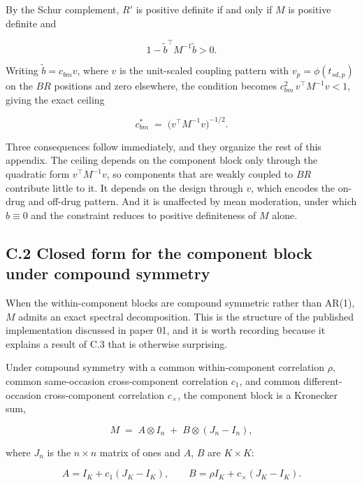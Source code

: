 \documentclass[
  11pt,
]{article}
\begin{document}
By the Schur complement, \(R'\) is positive definite if and only if \(M\)
is positive definite and

\[
1 - \tilde b^{\top} M^{-1} \tilde b > 0 .
\]

Writing \(\tilde b = c_{bm} v\), where \(v\) is the unit-scaled coupling
pattern with \(v_p = \phi(t_{sd,p})\) on the \(BR\) positions and zero
elsewhere, the condition becomes \(c_{bm}^{2}\, v^{\top} M^{-1} v <
1\), giving the exact ceiling

\begin{equation}
c_{bm}^{\ast} \;=\; \bigl(v^{\top} M^{-1} v\bigr)^{-1/2}.
\label{eq:ceiling}
\end{equation}

Three consequences follow immediately, and they organize the rest of
this appendix. The ceiling depends on the component block only
through the quadratic form \(v^{\top} M^{-1} v\), so components that
are weakly coupled to \(BR\) contribute little to it. It depends on the
design through \(v\), which encodes the on-drug and off-drug pattern.
And it is unaffected by mean moderation, under which \(b \equiv 0\) and
the constraint reduces to positive definiteness of \(M\) alone.

\subsection{C.2 Closed form for the component block under compound
symmetry}

When the within-component blocks are compound symmetric rather than
AR(1), \(M\) admits an exact spectral decomposition. This is the
structure of the published implementation discussed in paper 01, and
it is worth recording because it explains a result of C.3 that is
otherwise surprising.

Under compound symmetry with a common within-component correlation
\(\rho\), common same-occasion cross-component correlation \(c_1\), and
common different-occasion cross-component correlation \(c_{\times}\),
the component block is a Kronecker sum,

\begin{equation}
M \;=\; A \otimes I_n \;+\; B \otimes (J_n - I_n),
\label{eq:kron}
\end{equation}

where \(J_n\) is the \(n \times n\) matrix of ones and \(A\), \(B\) are
\(K \times K\):

\[
A = I_K + c_1 (J_K - I_K), \qquad
B = \rho I_K + c_{\times}(J_K - I_K).
\]
\end{document}
